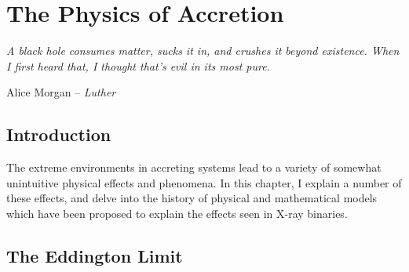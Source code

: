 \chapter{The Physics of Accretion}

\label{sec:PhysAcc}

\epigraph{\textit{A black hole consumes matter, sucks it in, and crushes it beyond existence. When I first heard that, I thought that's evil in its most pure.}}{Alice Morgan -- \textit{Luther}}


\section{Introduction}

\par The extreme environments in accreting systems lead to a variety of somewhat unintuitive physical effects and phenomena.  In this chapter, I explain a number of these effects, and delve into the history of physical and mathematical models which have been proposed to explain the effects seen in X-ray binaries.

\section{The Eddington Limit}

